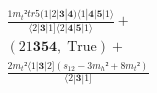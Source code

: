 \documentclass[varwidth, border=5pt]{standalone}
\begin{document}
\begin{my}
$\begin{gathered}
\scriptscriptstyle\frac{1m_t²tr5(1|2|𝟑|𝟒)⟨1|𝟒|𝟓|1⟩}{⟨2|𝟑|1]⟨2|𝟒|𝟓|1⟩} +\\
\scriptscriptstyle(21𝟑𝟓𝟒,\;\text{True}) +\\
\scriptscriptstyle\frac{2m_t²⟨1|𝟑|2](s_{12}-3m_h²+8m_t²)}{⟨2|𝟑|1]} \phantom{+}
\end{gathered}$
\end{my}
\end{document}
